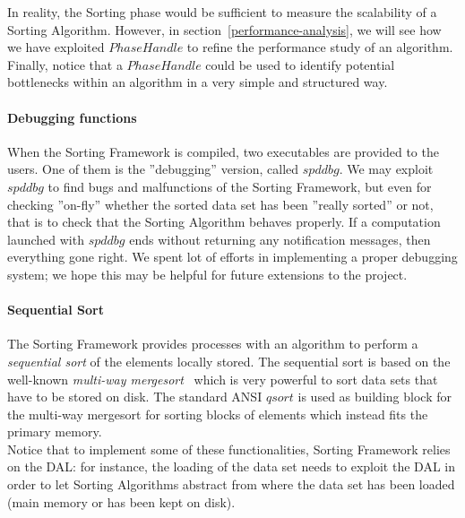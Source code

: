In reality, the Sorting phase would be sufficient to measure the scalability of a Sorting Algorithm. However, in section~\ref{performance-analysis}, we will see how we have exploited $PhaseHandle$ to refine the performance study of an algorithm. Finally, notice that a $PhaseHandle$ could be used to identify potential bottlenecks within an algorithm in a very simple and structured way.

\paragraph{Debugging functions} When the Sorting Framework is compiled, two executables are provided to the users. One of them is the ''debugging'' version, called $spddbg$. We may exploit $spddbg$ to find bugs and malfunctions of the Sorting Framework, but even for checking ''on-fly'' whether the sorted data set has been ''really sorted'' or not, that is to check that the Sorting Algorithm behaves properly. If a computation launched with $spddbg$ ends without returning any notification messages, then everything gone right. We spent lot of efforts in implementing a proper debugging system; we hope this may be helpful for future extensions to the project. 

\paragraph{Sequential Sort} The Sorting Framework provides processes with an algorithm to perform a \textit{sequential sort} of the elements locally stored. The sequential sort is based on the well-known \textit{multi-way mergesort}~\cite{FERR} which is very powerful to sort data sets that have to be stored on disk. The standard ANSI $qsort$ is used as building block for the multi-way mergesort for sorting blocks of elements which instead fits the primary memory. \\

Notice that to implement some of these functionalities, Sorting Framework relies on the DAL: for instance, the loading of the data set needs to exploit the DAL in order to let Sorting Algorithms abstract from where the data set has been loaded (main memory or has been kept on disk).

